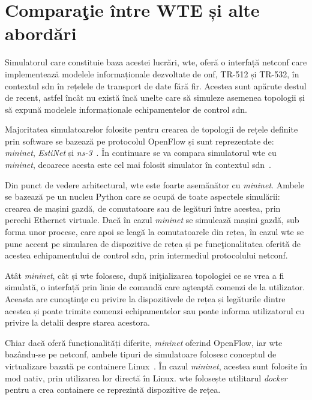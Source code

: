 \section{Comparaţie între WTE și alte abordări}

Simulatorul care constituie baza acestei lucrări, \gls{wte}, oferă o interfață \gls{netconf} care implementează modelele informaționale dezvoltate de \gls{onf}, TR-512 și TR-532, în contextul \gls{sdn} în rețelele de transport de date fără fir. Acestea sunt apărute destul de recent, astfel încât nu există încă unelte care să simuleze asemenea topologii și să expună modelele informaționale echipamentelor de control \gls{sdn}.

Majoritatea simulatoarelor folosite pentru crearea de topologii de rețele definite prin software se bazează pe protocolul OpenFlow și sunt reprezentate de: \textit{mininet}, \textit{EstiNet} și \textit{ns-3}~\cite{lantz2010network,wang2013estinet,wang2014comparison,henderson2008network}. În continuare se va compara simulatorul \gls{wte} cu \textit{mininet}, deoarece acesta este cel mai folosit simulator în contextul \gls{sdn}~\cite{brandonheller2013}.

Din punct de vedere arhitectural, \gls{wte} este foarte asemănător cu \textit{mininet}. Ambele se bazează pe un nucleu Python care se ocupă de toate aspectele simulării: crearea de mașini gazdă, de comutatoare sau de legături între acestea, prin perechi Ethernet virtuale. Dacă în cazul \textit{mininet} se simulează mașini gazdă, sub forma unor procese, care apoi se leagă la comutatoarele din rețea, în cazul \gls{wte} se pune accent pe simularea de dispozitive de rețea și pe funcţionalitatea oferită de acestea echipamentului de control \gls{sdn}, prin intermediul protocolului \gls{netconf}.

Atât \textit{mininet}, cât și \gls{wte} folosesc, după iniţializarea topologiei ce se vrea a fi simulată, o interfață prin linie de comandă care aşteaptă comenzi de la utilizator. Aceasta are cunoştinţe cu privire la dispozitivele de rețea și legăturile dintre acestea și poate trimite comenzi echipamentelor sau poate informa utilizatorul cu privire la detalii despre starea acestora.

Chiar dacă oferă funcționalități diferite, \textit{mininet} oferind OpenFlow, iar \gls{wte} bazându-se pe \gls{netconf}, ambele tipuri de simulatoare folosesc conceptul de virtualizare bazată pe containere Linux~\cite{handigol2012reproducible}. În cazul \textit{mininet}, acestea sunt folosite în mod nativ, prin utilizarea lor directă în Linux. \gls{wte} folosește utilitarul \textit{docker} pentru a crea containere ce reprezintă dispozitive de rețea.

